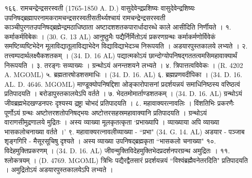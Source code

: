१६६. रामचन्द्रेन्द्रसरस्वती (1765-1850 A. D.)
वासुदेवेन्द्रप्रशिष्यः वासुदेवेन्द्रशिष्यः उपनिषद्ब्रह्मापरनामकरामचन्द्रसरस्वतीसतीर्थ्यश्चायं रामचन्द्रेन्द्रसरस्वती काञ्चीपुरगतउपनिषद्ब्रह्मेन्द्रमठाधिष्ठाता अष्टादशशतकपारार्धादारब्धे काले आसीदिति निर्णीयते ।
१. कर्माकर्मविबेकः । (30. G. 13 AL) आनुष्ठुभैः पद्यैर्निर्मितोऽयं प्रकरणग्रन्थः कर्माकर्मणोर्विवेकं समष्टिव्यष्टिभेदेन मूलाविद्यातूलाविद्याभेदेन विद्याविद्याभेदञ्च निरूपयति । अडयारपुस्तकालये लभ्यते ।
२. तत्त्वम्पदार्थलक्ष्यैकशतकम् । (34. D. 16 AL) पद्यात्मकोऽयं छान्दोग्योपनिषद्गततत्वमसिमहावाक्यार्थं निरूपयति ।
३. तरङ्गः सव्याख्यः । ग्रन्थोऽयं अनन्तशयने लभ्यते ।
४. त्रिपात्तत्वविवेकः । (R. 4202 A. MGOML)
५. ब्रह्मतारषोडशसमाधिः । (34. D. 16. AL)
६. ब्रह्मप्रणवदीपिका । (34. D. 16. AL. D. 4646. MGOML) माण्डूक्योपनिषद्दिशा ओङ्कारोपासनां प्रदर्शयन्नयं समाधिनिष्ठस्य वरिष्ठत्वं प्रतिपादयति । बरोडापुस्तकालयेऽपि वर्तते ।
७. भेदतमोमार्ताण्डशतकम् । (34. D. 16. AL) ग्रन्थोऽयं जीवब्रह्मभेदखण्डनपरः दृश्यस्य द्रष्ट्रा चोभदं प्रतिपादयति ।
८. महावाक्यरत्नावलिः ।
विंशतिभिः प्रकरणैः पूर्णोऽयं ग्रन्थः अष्टोत्तरशतोपनिषद्भयः अष्टोत्तरसहस्रमहावाक्यानि प्रतिपादयति । ग्रन्थोऽयं वाराणसीमुद्रणालये मुद्रितः । अस्य व्याख्या मूलकृतत्कृता `प्रभाख्यापि । व्याख्याया अपि व्याख्या भासकलोचनाख्या वर्तते ।'
९. महावाक्यरत्नावलीव्याख्या - ``प्रभा" (34. G. 14. AL) अडयार - पञ्जाब शृङ्गगिरि - मैसूरसूचिषु दृश्यते । अस्य व्याख्या उपनिषद्ब्रह्मकृता ``भासकलो चनाख्या"
१०. विदेहमुक्तिप्रकरणम् । (34. D. 16. AL) जीवन्मुक्तिविदेहमुक्तिभेदप्रदर्शनपरग्रन्थ अमुद्रितः ।
११. श्लोकत्रयम् । (D. 4769. MGOML) त्रिभिः पद्यैरद्वैतसारं प्रदर्शयन्नयं ``विश्वंब्रह्मैवनेतरदिति" प्रतिपादयति । अमुद्रितोऽयं अडयारपुस्तकालयेऽपि लभ्यते ।

